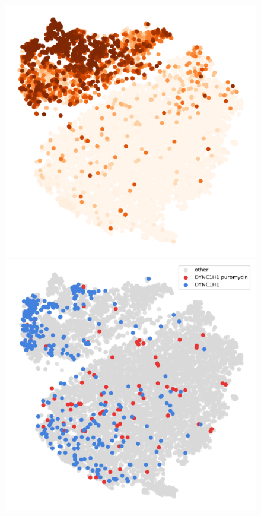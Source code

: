 \begin{figure}[h]
	\centering
		\includegraphics[width=\linewidth]{figures/appendix/tsne_probability_nocolorbar_foci}
		\vfill
		\includegraphics[width=\linewidth]{figures/appendix/tsne_foci_DYNC1H1}

\end{figure}
